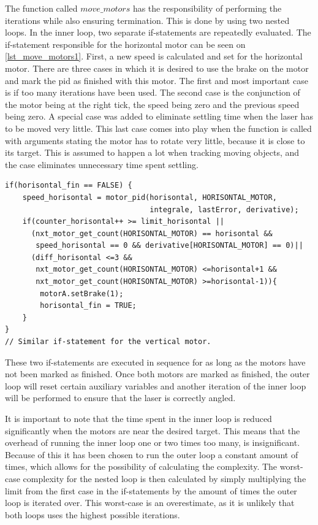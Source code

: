 The function called $move\_motors$ has the responsibility of performing the iterations while also ensuring termination. This is done by using two nested loops. In the inner loop, two separate if-statements are repeatedly evaluated. The if-statement responsible for the horizontal motor can be seen on \cref{lst_move_motors1}. First, a new speed is calculated and set for the horizontal motor. There are three cases in which it is desired to use the brake on the motor and mark the \gls{pid} as finished with this motor. The first and most important case is if too many iterations have been used. The second case is the conjunction of the motor being at the right tick, the speed being zero and the previous speed being zero. A special case was added to eliminate settling time when the laser has to be moved very little. This last case comes into play when the function is called with arguments stating the motor has to rotate very little, because it is close to its target. This is assumed to happen a lot when tracking moving objects, and the case eliminates unnecessary time spent settling.
\begin{lstlisting}[language=inc_cpp, caption={The \textit{move\_motors} function}, label=lst_move_motors1]
if(horisontal_fin == FALSE) {
    speed_horisontal = motor_pid(horisontal, HORISONTAL_MOTOR, 
                                 integrale, lastError, derivative);
    if(counter_horisontal++ >= limit_horisontal || 
      (nxt_motor_get_count(HORISONTAL_MOTOR) == horisontal && 
       speed_horisontal == 0 && derivative[HORISONTAL_MOTOR] == 0)|| 
      (diff_horisontal <=3 && 
       nxt_motor_get_count(HORISONTAL_MOTOR) <=horisontal+1 && 
       nxt_motor_get_count(HORISONTAL_MOTOR) >=horisontal-1)){
        motorA.setBrake(1);
        horisontal_fin = TRUE;
    }
}
// Similar if-statement for the vertical motor.
\end{lstlisting}
These two if-statements are executed in sequence for as long as the motors have not been marked as finished. Once both motors are marked as finished, the outer loop will reset certain auxiliary variables and another iteration of the inner loop will be performed to ensure that the laser is correctly angled. 

It is important to note that the time spent in the inner loop is reduced significantly when the motors are near the desired target. This means that the overhead of running the inner loop one or two times too many, is insignificant. Because of this it has been chosen to run the outer loop a constant amount of times, which allows for the possibility of calculating the complexity. The worst-case complexity for the nested loop is then calculated by simply multiplying the limit from the first case in the if-statements by the amount of times the outer loop is iterated over. This worst-case is an overestimate, as it is unlikely that both loops uses the highest possible iterations.